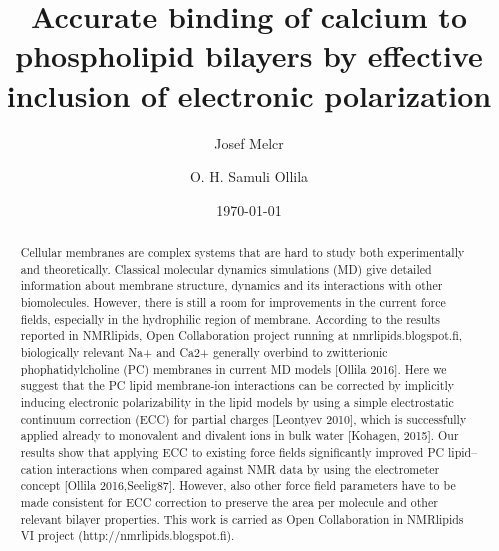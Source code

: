 \documentclass[aps,prl,superscriptaddress,twocolumn]{revtex4}
\begin{document}

\title{Accurate binding of calcium to phospholipid bilayers by effective inclusion of electronic polarization} %



\author{Josef Melcr}

\author{O. H. Samuli Ollila}



\date{\today}

\begin{abstract}
  Cellular membranes are complex systems that are hard to study both experimentally and theoretically. Classical molecular dynamics simulations (MD)
give detailed information about membrane structure, dynamics and its interactions with other biomolecules. However,  there is still a room for
improvements in the current force fields, especially in the hydrophilic region of membrane.  According to the results reported in NMRlipids, Open Collaboration project
running at nmrlipids.blogspot.fi, biologically relevant Na+ and Ca2+ generally overbind to zwitterionic phophatidylcholine (PC) membranes in current MD models [Ollila 2016].
Here we suggest that the PC lipid membrane-ion interactions can be corrected by implicitly inducing electronic polarizability in the lipid models by
using a simple electrostatic continuum correction (ECC) for partial charges [Leontyev 2010], which is successfully applied already to monovalent and divalent ions in bulk water [Kohagen, 2015].
Our results show that applying ECC to existing force fields significantly improved PC lipid--cation interactions when compared against NMR data
by using the electrometer concept [Ollila 2016,Seelig87]. However, also other force field parameters have to be made consistent
for ECC correction to preserve the area per molecule and other relevant bilayer properties. This work is carried as Open Collaboration
in NMRlipids VI project (http://nmrlipids.blogspot.fi).
\end{abstract}
\end{document}
